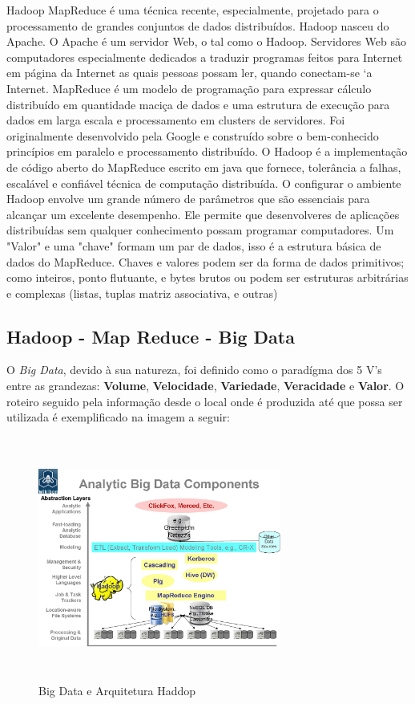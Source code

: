 \documentclass[conference,compsoc]{IEEEtran}
\begin{document}
Hadoop MapReduce é uma técnica recente, especialmente, projetado para o processamento de grandes conjuntos de dados distribuídos. Hadoop nasceu do Apache. O Apache é um servidor Web, o tal como o Hadoop. Servidores Web são computadores especialmente dedicados a traduzir programas feitos para Internet em página da Internet as quais pessoas possam ler, quando conectam-se `a Internet. MapReduce é um modelo de programação para expressar cálculo distribuído em quantidade maciça de
dados e uma estrutura de execução para dados em larga escala e processamento em clusters de servidores. Foi originalmente desenvolvido pela Google e construído sobre o bem-conhecido
princípios em paralelo e processamento distribuído.
O Hadoop é a implementação de código aberto do MapReduce escrito em java que fornece, tolerância a falhas, escalável e confiável técnica de computação distribuída.
O configurar o ambiente Hadoop envolve um grande número de parâmetros que são essenciais para alcançar um excelente desempenho. Ele permite que desenvolveres de aplicações distribuídas sem qualquer conhecimento possam programar computadores. 
Um "Valor" e uma "chave" formam um par de dados, isso é a estrutura básica de dados do MapReduce. 
Chaves e valores podem ser da forma de dados primitivos; como inteiros, ponto flutuante,  e bytes brutos ou podem ser estruturas arbitrárias e complexas (listas, tuplas matriz associativa, e outras)


\subsection{Hadoop - Map Reduce - Big Data}\label{arte:palavraChave:HadoopMapReduce}

O \textit{Big Data}, devido à sua natureza, foi definido como o paradígma dos 5 V's entre as grandezas: \textbf{Volume}, \textbf{Velocidade}, \textbf{Variedade}, \textbf{Veracidade} e \textbf{Valor}.
O roteiro seguido pela informação desde o local onde é produzida até que possa ser utilizada é  exemplificado na imagem a seguir:

\begin{figure}[ht]
\centering
\caption{Big Data e Arquitetura Haddop}
\includegraphics[width=80mm, height=80mm]{Figuras/BigDataComponents.jpg}
\end{figure}
\end{document}
